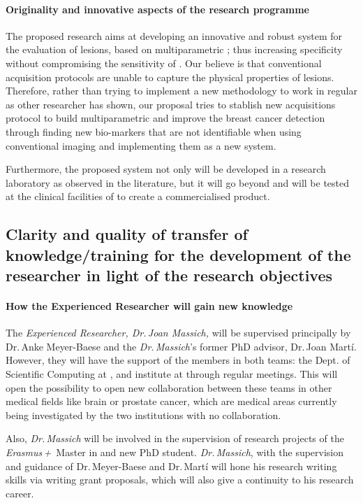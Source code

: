 \paragraph{Originality and innovative aspects of the research programme}

The proposed research aims at developing an innovative and robust \cad system for the evaluation of \nmle lesions, based on multiparametric \mri; thus increasing specificity without compromising the sensitivity of \cemri.
Our believe is that conventional \mri acquisition protocols are unable to capture the physical properties of \nmle lesions.
Therefore, rather than trying to implement a new \cad methodology to work in regular \mri as other researcher has shown,
our proposal tries to stablish new \mri acquisitions protocol to build multiparametric \mri and improve the breast cancer detection through finding new bio-markers that are not identifiable when using conventional imaging and implementing them as a new \cad system.

Furthermore, the proposed \cad system not only will be developed in a research laboratory as observed in the literature, but it will go beyond and will be tested at the clinical facilities of \udiat to create a commercialised product.

\subsection{Clarity and quality of transfer of knowledge/training for the development of the researcher in light of the research objectives}
\label{sec:transfer}

\paragraph{How the Experienced Researcher will gain new knowledge}

The \emph{Experienced Researcher, Dr.\,Joan Massich,} will be supervised principally by Dr.\,Anke Meyer-Baese and the \emph{Dr.\,Massich}'s former PhD advisor, Dr.\,Joan Mart\'i.
However, they will have the support of the members in both teams: the Dept. of Scientific Computing at \florida, and \vicorob institute at \udg through regular meetings. This will open the possibility to open new collaboration between these teams in other medical fields like brain \mri or prostate cancer, which are medical areas currently being investigated by the two institutions with no collaboration.

Also, \emph{Dr.\,Massich} will be involved in the supervision of research projects of the \emph{Erasmus\,+\,} Master in \maia {} and new PhD student. \emph{Dr.\,Massich}, with the supervision and guidance of Dr.\,Meyer-Baese and Dr.\,Mart\'i will hone his research writing skills via writing grant proposals, which will also give a continuity to his research career.




